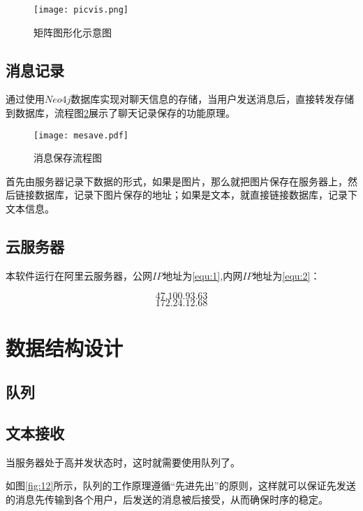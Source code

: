\documentclass[forprint]{sql}
\begin{document}
\begin{figure}[!htbp]
	\centering
	\texttt{[image: picvis.png]}
	\caption{矩阵图形化示意图}
	\label{fig:15}
\end{figure}

\section{消息记录}

通过使用$Neo4j$数据库实现对聊天信息的存储，当用户发送消息后，直接转发存储到数据库，流程图\ref{fig:13}展示了聊天记录保存的功能原理。

\begin{figure}[!htbp]
	\centering
	\texttt{[image: mesave.pdf]}
	\caption{消息保存流程图}
	\label{fig:13}
\end{figure}

首先由服务器记录下数据的形式，如果是图片，那么就把图片保存在服务器上，然后链接数据库，记录下图片保存的地址；如果是文本，就直接链接数据库，记录下文本信息。

\section{云服务器}

本软件运行在阿里云服务器，公网$IP$地址为\ref{equ:1},内网$IP$地址为\ref{equ:2}：

\begin{equation}
	\label{equ:1}
	47.100.93.63
\end{equation}
\begin{equation}
	\label{equ:2}
	172.24.12.68
\end{equation}
\clearpage
\chapter{数据结构设计}
\section{队列}

\section{文本接收}

当服务器处于高并发状态时，这时就需要使用队列了。

如图\ref{fig:12}所示，队列的工作原理遵循“先进先出”的原则，这样就可以保证先发送的消息先传输到各个用户，后发送的消息被后接受，从而确保时序的稳定。
\end{document}
